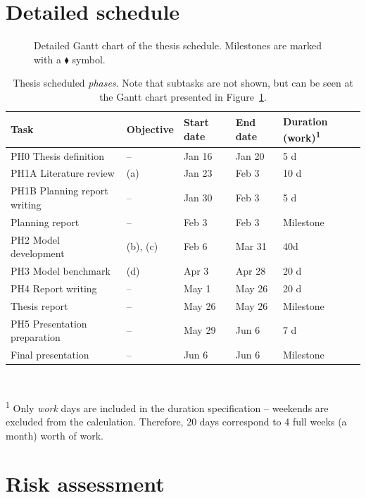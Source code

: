 \documentclass[a4paper,fontsize=10pt,bibliography=totoc]{scrartcl}
\newcommand{\fref}[1]{Figure~\ref{#1}}
\begin{document}
\appendix
\section{Detailed schedule}
\label{a:schedule}
\begin{figure}[h!]
\centering
{\setlength{\fboxsep}{0pt}}
\caption{Detailed Gantt chart of the thesis schedule. Milestones are marked with a $\blacklozenge$ symbol.}
\label{f:gantt}
\end{figure}

\begin{table}[h!]
\centering
\footnotesize
\caption{Thesis scheduled \textit{phases}. Note that subtasks are not shown, but can be seen at the Gantt chart presented in \fref{f:gantt}.}
\label{t:schedule}
\begin{tabular}{lllll}
\toprule
Task & Objective & Start date & End date & Duration (work)\textsuperscript{1} \\
\midrule
PH0 Thesis definition & -- & Jan 16 & Jan 20 & 5 d \\
PH1A Literature review & (a) & Jan 23 & Feb 3 & 10 d \\
PH1B Planning report writing & -- & Jan 30 & Feb 3 & 5 d \\
Planning report & -- & Feb 3 & Feb 3 & Milestone \\
PH2 Model development & (b), (c) & Feb 6 & Mar 31 & 40d \\
PH3 Model benchmark & (d) & Apr 3 & Apr 28 & 20 d \\
PH4 Report writing & -- & May 1 & May 26 & 20 d \\
Thesis report & -- & May 26 & May 26 & Milestone \\
PH5 Presentation preparation & -- & May 29 & Jun 6 & 7 d \\
Final presentation & -- & Jun 6 & Jun 6 & Milestone \\
\bottomrule
\end{tabular}
{\\ \scriptsize \parbox{0.7\linewidth}{\textsuperscript{1} Only \textit{work} days are included in the duration specification -- weekends are excluded from the calculation. Therefore, 20 days correspond to 4 full weeks (a month) worth of work.}}
\end{table}

\section{Risk assessment}
\label{a:risk-assessment}
\begin{table}
\label{t:risks}
\end{table}
\end{document}
